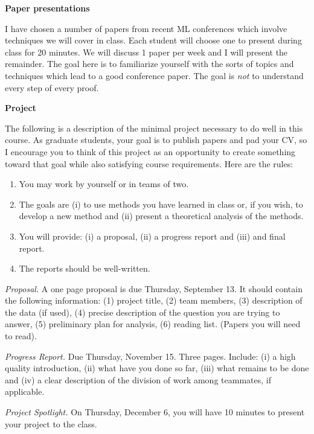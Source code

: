 \documentclass[10pt]{article}
\begin{document}
{\bf Paper presentations}

I have chosen a number of papers from recent ML conferences which involve
techniques we will cover in class. Each student will choose one to
present during class for 20 minutes. We will discuss 1 paper per week
and I will present the remainder. The goal here is to familiarize
yourself with the sorts of topics and techniques which lead to a good
conference paper. The goal is {\em not} to understand every step of
every proof.


{\bf Project}

The following is a description of the minimal project necessary to do
well in this course. As graduate students, your goal is to publish
papers and pad your CV, so I encourage you to think of this project as
an opportunity to create something toward that goal while also
satisfying course requirements. Here are the rules:
\begin{enumerate}
\item You may work by yourself or in teams of two.
\item The goals are (i) to use methods you have learned in class or, if you wish, to develop a
new method and (ii) present a theoretical analysis of the methods.
\item You will provide: (i) a proposal, (ii) a progress report and (iii) and final report.
\item The reports should be well-written.
\end{enumerate}

{\em Proposal.} A one page proposal is due Thursday, September 13. It
should contain the following information: (1) project title, (2) team
members, (3) description of the data (if used), (4) precise description of the
question you are trying to answer, (5) preliminary plan
for analysis, (6) reading list. (Papers you will need to read). 

{\em Progress Report.} Due Thursday, November 15. Three
pages. Include: (i) a high quality introduction, (ii) what have you
done so far, (iii) what remains to be done and (iv) a clear
description of the division of work among teammates, if applicable. 

{\em Project Spotlight.} On Thursday, December 6, you will have 10
minutes to present your project to the class. 
\end{document}
